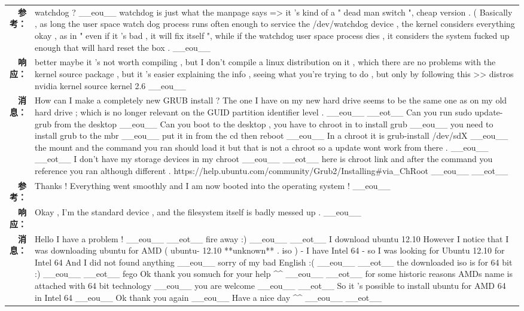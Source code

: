 \begin{tabularx}{\textwidth}{@{}rX@{}}
\textbf{参考：}&watchdog ? \_\_eou\_\_ watchdog is just what the manpage says => it 's kind of a " dead man switch ", cheap version . ( Basically , as long the user space watch dog process runs often enough to service the /dev/watchdog device , the kernel considers everything okay , as in " even if it 's bad , it will fix itself ", while if the watchdog user space process dies , it considers the system fucked up enough that will hard reset the box . \_\_eou\_\_\\%
\textbf{响应：}&better maybe it 's not worth compiling , but I don't compile a linux distribution on it , which there are no problems with the kernel source package , but it 's easier explaining the info , seeing what you're trying to do , but only by following this >> distros nvidia kernel source kernel 2.6 \_\_eou\_\_\\%
\midrule%
\textbf{消息：}&How can I make a completely new GRUB install ? The one I have on my new hard drive seems to be the same one as on my old hard drive ; which is no longer relevant on the GUID partition identifier level . \_\_eou\_\_ \_\_eot\_\_ Can you run sudo update{-}grub from the desktop \_\_eou\_\_ Can you boot to the desktop , you have to chroot in to install grub \_\_eou\_\_ you need to install grub to the mbr \_\_eou\_\_ put it in from the cd then reboot \_\_eou\_\_ In a chroot it is grub{-}install /dev/sdX \_\_eou\_\_ the mount and the command you ran should load it but that is not a chroot so a update wont work from there . \_\_eou\_\_ \_\_eot\_\_ I don't have my storage devices in my chroot \_\_eou\_\_ \_\_eot\_\_ here is chroot link and after the command you reference you ran although different . https://help.ubuntu.com/community/Grub2/Installing\#via\_ChRoot \_\_eou\_\_ \_\_eot\_\_\\%
\textbf{参考：}&Thanks ! Everything went smoothly and I am now booted into the operating system ! \_\_eou\_\_\\%
\textbf{响应：}&Okay , I'm the standard device , and the filesystem itself is badly messed up . \_\_eou\_\_\\%
\midrule%
\textbf{消息：}&Hello I have a problem ! \_\_eou\_\_ \_\_eot\_\_ fire away :) \_\_eou\_\_ \_\_eot\_\_ I download ubuntu 12.10 However I notice that I was downloading ubuntu for AMD ( ubuntu{-} 12.10 **unknown** . iso ) {-} I have Intel 64 {-} so I was looking for Ubuntu 12.10 for Intel 64 And I did not found anything \_\_eou\_\_ sorry of my bad English :( \_\_eou\_\_ \_\_eot\_\_ the downloaded iso is for 64 bit :) \_\_eou\_\_ \_\_eot\_\_ fego Ok thank you somuch for your help \^{}\^{} \_\_eou\_\_ \_\_eot\_\_ for some historic reasons AMDs name is attached with 64 bit technology \_\_eou\_\_ you are welcome \_\_eou\_\_ \_\_eot\_\_ So it 's possible to install ubuntu for AMD 64 in Intel 64 \_\_eou\_\_ Ok thank you again \_\_eou\_\_ Have a nice day \^{}\^{} \_\_eou\_\_ \_\_eot\_\_\\%

\end{tabularx}
